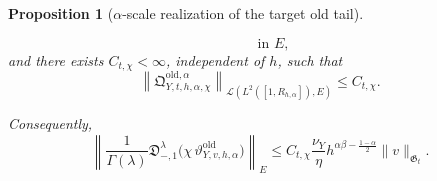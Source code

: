 \documentclass[11pt,a4paper]{amsart}
\theoremstyle{plain}
\newtheorem{proposition}[theorem]{Proposition}
\theoremstyle{definition}
\theoremstyle{remark}
\begin{document}
\begin{proposition}[\(\alpha\)-scale realization of the target old tail]
\begin{enumerate}[label=(\roman*)]
\begin{equation}
\qquad\text{in }E,
\end{equation}
and there exists \(C_{t,\chi}<\infty\), independent of \(h\), such that
\begin{equation}\label{eq:full-h-target-old-tail-alpha-opbound}
\left\|
\mathfrak Q_{Y,t,h,\alpha,\chi}^{\mathrm{old},\alpha}
\right\|_{\mathcal L(L^2([1,R_{h,\alpha}]),E)}
\le
C_{t,\chi}.
\end{equation}
\end{enumerate}
Consequently,
\begin{equation}\label{eq:full-h-target-old-tail-alpha-bound}
\left\|
\frac{1}{\Gamma(\lambda)}
\mathfrak D_{-,1}^{\lambda}
\bigl(
\chi\,\vartheta_{Y,v,h,\alpha}^{\mathrm{old}}
\bigr)
\right\|_{E}
\le
C_{t,\chi}\frac{\nu_Y}{\eta}
h^{\alpha\beta-\frac{1-\alpha}{2}}
\|v\|_{\mathfrak G_t}.
\end{equation}
\end{proposition}
\end{document}
